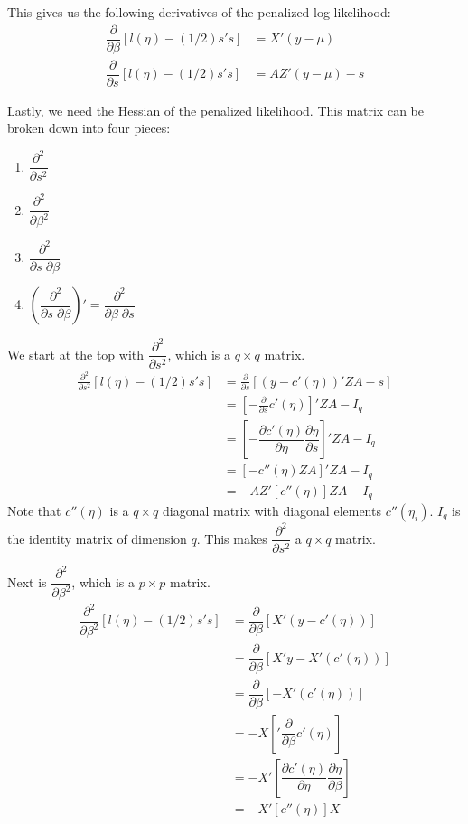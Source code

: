 \documentclass{article}
\begin{document}
This gives us the following derivatives of the penalized log likelihood:
\begin{align}
\dfrac{\partial}{\partial \beta} \left[ l(\eta)-(1/2)s's \right]&= X' (y-\mu)\\
\dfrac{\partial}{\partial s} \left[ l(\eta)-(1/2)s's \right]&= AZ' (y-\mu)  -s
\end{align}

Lastly, we need the Hessian of the penalized likelihood. This matrix can be broken down into four pieces: 
\begin{enumerate}
\item $ \dfrac{\partial^2}{\partial s^2}$
\item $ \dfrac{\partial^2}{\partial \beta^2}$
\item $\dfrac{\partial^2}{ \partial s \; \partial \beta}$
\item $\left(\dfrac{\partial^2}{ \partial s \; \partial \beta}\right) ' =\dfrac{\partial^2}{ \partial \beta \; \partial s}$
\end{enumerate}

We start at the top with  $ \dfrac{\partial^2}{\partial s^2}$, which is a $q \times q$ matrix.
\begin{align}
  \frac{\partial^2}{\partial s^2}  \left[ l(\eta) - (1/2) s's   \right] &=   \frac{\partial}{\partial s} \left[ (y-c'(\eta))'ZA -s   \right]\\
&=\left[- \frac{\partial}{\partial s} c'(\eta)\right]'ZA - I_q \\
&= \left[-\dfrac{\partial c'(\eta)}{\partial \eta} \dfrac{\partial \eta}{\partial s}   \right] 'ZA - I_q \\
&= \left[ -c''(\eta) ZA  \right]'ZA - I_q \\
&= -AZ' \left[ c''(\eta) \right] ZA - I_q
\end{align}
Note that $c''(\eta)$ is a $q\times q$ diagonal matrix with diagonal elements $c''(\eta_i)$.  $I_q$ is the identity matrix of dimension $q$.  This makes  $ \dfrac{\partial^2}{\partial s^2}$ a $q \times q$ matrix.

Next  is  $ \dfrac{\partial^2}{\partial \beta^2}$, which is a $p \times p$ matrix.
\begin{align}
  \dfrac{\partial^2}{\partial \beta^2}  \left[ l(\eta) - (1/2) s's   \right] &=   \dfrac{\partial}{\partial \beta} \left[ X' (y-c'(\eta))  \right]\\
&= \dfrac{\partial}{\partial \beta} \left[ X' y-X'(c'(\eta))  \right] \\
&= \dfrac{\partial}{\partial \beta} \left[ -X'(c'(\eta))  \right] \\
&=-X  \left[' \dfrac{\partial}{\partial \beta} c'(\eta)  \right] \\
&=-X'  \left[ \dfrac{\partial  c'(\eta)}{\partial \eta} \dfrac{\partial \eta}{\partial \beta}  \right] \\
&=-X'  \left[ c''(\eta)\right]  X   
\end{align}
\end{document}
